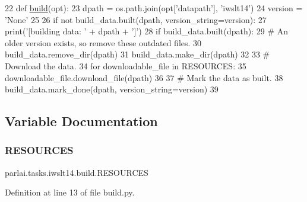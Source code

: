 \begin{DoxyCode}
22 \textcolor{keyword}{def }\hyperlink{namespacedialog__babi__feedback_1_1build_a7a9d289f7493a5ded13c4b7f071b6184}{build}(opt):
23     dpath = os.path.join(opt[\textcolor{stringliteral}{'datapath'}], \textcolor{stringliteral}{'iwslt14'})
24     version = \textcolor{stringliteral}{'None'}
25 
26     \textcolor{keywordflow}{if} \textcolor{keywordflow}{not} build\_data.built(dpath, version\_string=version):
27         print(\textcolor{stringliteral}{'[building data: '} + dpath + \textcolor{stringliteral}{']'})
28         \textcolor{keywordflow}{if} build\_data.built(dpath):
29             \textcolor{comment}{# An older version exists, so remove these outdated files.}
30             build\_data.remove\_dir(dpath)
31         build\_data.make\_dir(dpath)
32 
33         \textcolor{comment}{# Download the data.}
34         \textcolor{keywordflow}{for} downloadable\_file \textcolor{keywordflow}{in} RESOURCES:
35             downloadable\_file.download\_file(dpath)
36 
37         \textcolor{comment}{# Mark the data as built.}
38         build\_data.mark\_done(dpath, version\_string=version)
39 \end{DoxyCode}


\subsection{Variable Documentation}
\mbox{\label{namespaceparlai_1_1tasks_1_1iwslt14_1_1build_a1117136c67fac42f4009b271744df3e4}} 
\subsubsection{\texorpdfstring{R\+E\+S\+O\+U\+R\+C\+ES}{RESOURCES}}
{\footnotesize\ttfamily parlai.\+tasks.\+iwslt14.\+build.\+R\+E\+S\+O\+U\+R\+C\+ES}



Definition at line 13 of file build.\+py.


